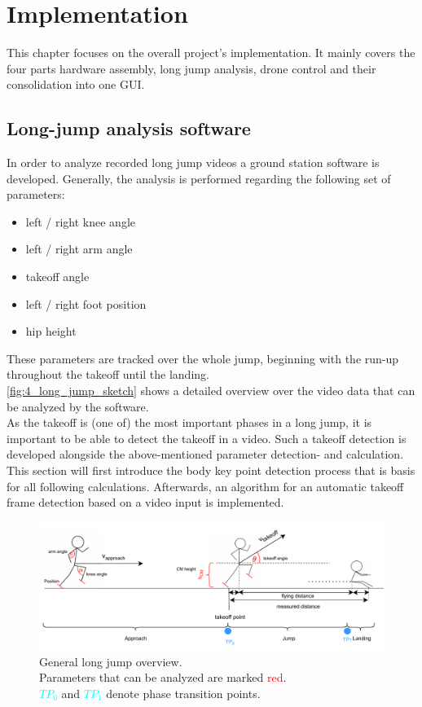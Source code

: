 \graphicspath{{./figures/}}
\chapter{Implementation}
This chapter focuses on the overall project's implementation.
It mainly covers the four parts hardware assembly, long jump analysis,
drone control and their consolidation into one \ac{GUI}.

\section{Long-jump analysis software}\label{sec:4_analysis_software}
In order to analyze recorded long jump videos a ground station software is
developed.
Generally, the analysis is performed regarding the following set of
parameters:
\begin{itemize}
    \item left / right knee angle
    \item left / right arm angle
    \item takeoff angle
    \item left / right foot position
    \item hip height
\end{itemize}
These parameters are tracked over the whole jump, beginning with the run-up
throughout the takeoff until the landing.\\
\autoref{fig:4_long_jump_sketch} shows a detailed overview over the video data
that can be analyzed by the software.\\
As the takeoff is (one of) the most important phases in a long jump, it is
important to be able to detect the takeoff in a video.
Such a takeoff detection is developed alongside the above-mentioned parameter 
detection- and calculation.\\
This section will first introduce the body key point detection process that
is basis for all following calculations.
Afterwards, an algorithm for an automatic takeoff frame detection based on a
video input is implemented.
\begin{figure}[!h]
    \centering
    \includegraphics[scale=0.6]{long_jump_sketch.pdf}
    \caption[Long jump parameter overview]{General long jump overview.\\
    Parameters that can be analyzed are marked \textcolor{red}{red}.\\
    \textcolor{cyan}{$TP_0$} and \textcolor{cyan}{$TP_1$} denote phase
    transition points.}
    \label{fig:4_long_jump_sketch}
\end{figure}
\FloatBarrier

